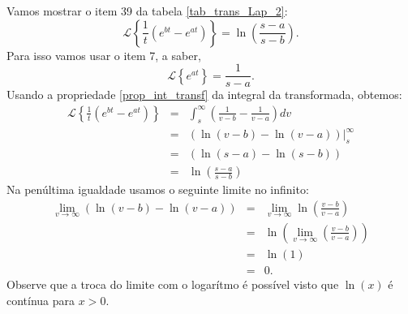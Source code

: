 \begin{ex}Vamos mostrar o item 39 da tabela \ref{tab_trans_Lap_2}:
\begin{equation}
\mathcal{L}\left\{\frac{1}{t}\left(e^{bt}-e^{at}\right)\right\}=\ln\left(\frac{s-a}{s-b}\right).
\end{equation}
Para isso vamos usar o item 7, a saber,
\begin{equation*}
\mathcal{L}\left\{e^{at}\right\}=\frac{1}{s-a}.
\end{equation*}
Usando a propriedade \ref{prop_int_transf} da integral da transformada, obtemos:
\begin{eqnarray*}
\mathcal{L}\left\{\frac{1}{t}\left(e^{bt}-e^{at}\right)\right\}&=&\int_s^\infty \left(\frac{1}{v-b}-\frac{1}{v-a}\right)dv\\
&=& \left.\left(\ln(v-b)-\ln(v-a)\right)\right|_s^\infty\\
&=& \left(\ln(s-a)-\ln(s-b)\right)\\
&=&\ln\left(\frac{s-a}{s-b}\right)
\end{eqnarray*}
Na penúltima igualdade usamos o seguinte limite no infinito:
\begin{eqnarray*}
\lim_{v\to\infty} \left(\ln(v-b)-\ln(v-a)\right)&=&\lim_{v\to\infty} \ln\left(\frac{v-b}{v-a}\right)\\
&=& \ln\left(\lim_{v\to\infty}\left(\frac{v-b}{v-a}\right)\right)\\
&=& \ln\left(1\right)\\
&=&0.
\end{eqnarray*}
Observe que a troca do limite com o logarítmo é possível visto que $\ln(x)$ é contínua para $x>0$.
\end{ex}
